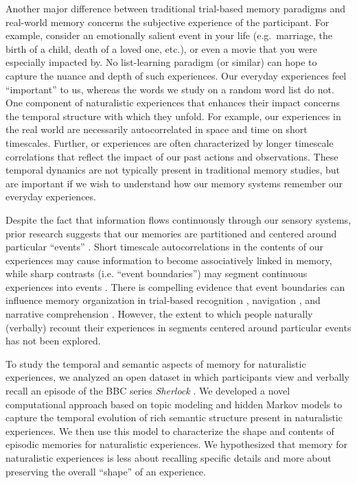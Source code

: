 \documentclass{article}
\begin{document}
{Another major difference between traditional trial-based memory paradigms and real-world memory concerns the subjective experience of the participant.  For example, consider an emotionally salient event in your life (e.g.\ marriage, the birth of a child, death of a loved one, etc.), or even a movie that you were especially impacted by.  No list-learning paradigm (or similar) can hope to capture the nuance and depth of such experiences.  Our everyday experiences feel ``important'' to us, whereas the words we study on a random word list do not.  One component of naturalistic experiences that enhances their impact concerns the temporal structure with which they unfold.  For example, our experiences in the real world are necessarily autocorrelated in space and time on short timescales.  Further, or experiences are often characterized by longer timescale correlations that reflect the impact of our past actions and observations.  These temporal dynamics are not typically present in traditional memory studies, but are important if we wish to understand how our memory systems remember our everyday experiences.

Despite the fact that information flows continuously through our sensory systems, prior research suggests that our memories are partitioned and centered around particular ``events'' \citep{Radv12, RadvZack11, BrunEtal18}. Short timescale autocorrelations in the contents of our experiences may cause information to become associatively linked in memory, while sharp contrasts (i.e. ``event boundaries'') may segment continuous experiences into events \citep{HeusEtal18, BrunEtal18, Radv12}. There is compelling evidence that event boundaries can influence memory organization in trial-based recognition \citep{HeusEtal18}, navigation \citep{BrunEtal18}, and narrative comprehension \citep{ZwaaRadv98, EzzyDava11}.  However, the extent to which people naturally (verbally) recount their experiences in segments centered around particular events has not been explored.

To study the temporal and semantic aspects of memory for naturalistic experiences, we analyzed an open dataset in which participants view and verbally recall an episode of the BBC series \textit{Sherlock}  \citep{ChenEtal17}. We developed a novel computational approach based on topic modeling \citep{BleiEtal03} and hidden Markov models \citep{Rabi89, BaldEtal17} to capture the temporal evolution of rich semantic structure present in naturalistic experiences. We then use this model to characterize the shape and contents of episodic memories for naturalistic experiences. We hypothesized that memory for naturalistic experiences is less about recalling specific details and more about preserving the overall ``shape'' of an experience.

}
\end{document}
